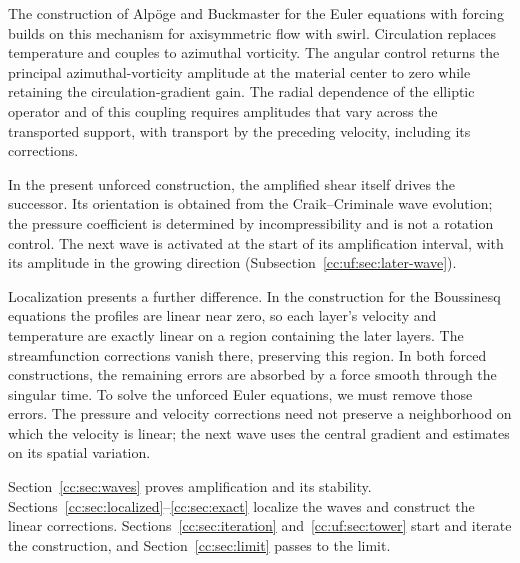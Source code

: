 The construction of Alp\"oge and Buckmaster
\cite[Section~1.2]{AlpogeBuckmasterForcedEuler} for the Euler equations
with forcing builds on this mechanism for axisymmetric flow with swirl. Circulation replaces temperature and
couples to azimuthal vorticity. The angular control returns the principal
azimuthal-vorticity amplitude at the material center to zero while
retaining the circulation-gradient gain. The radial dependence of the
elliptic operator and of this coupling requires amplitudes that vary
across the transported support, with transport by the preceding velocity,
including its corrections.

In the present unforced construction, the amplified shear itself drives the successor. Its orientation
is obtained from the Craik--Criminale wave evolution; the pressure coefficient
is determined by incompressibility and is not a rotation control.
The next wave is activated at the start of its amplification interval,
with its amplitude in the growing direction (Subsection~\ref{cc:uf:sec:later-wave}).

Localization presents a further difference. In the construction for
the Boussinesq equations the profiles are linear near zero, so each layer's velocity and temperature are exactly linear
on a region containing the later layers. The streamfunction corrections vanish there, preserving
this region. In both forced constructions, the remaining errors are
absorbed by a force smooth through the singular time. To solve the unforced Euler equations,
we must remove those errors. The pressure and velocity
corrections need not preserve a neighborhood on which the velocity is linear;
the next wave uses the central gradient and estimates on its spatial variation.

Section~\ref{cc:sec:waves} proves amplification and its stability.
Sections~\ref{cc:sec:localized}--\ref{cc:sec:exact} localize the waves
and construct the linear corrections.
Sections~\ref{cc:sec:iteration} and~\ref{cc:uf:sec:tower} start and
iterate the construction, and Section~\ref{cc:sec:limit} passes to the limit.


